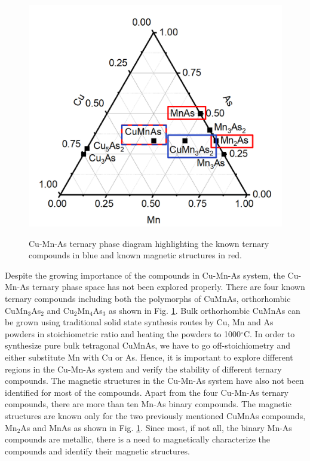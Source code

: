 \documentclass[11pt,edeposit,draftthesis]{uiucthesis2020}
\begin{document}
\begin{mainmatter}
\begin{figure}
\centering\includegraphics[width=0.8\columnwidth]{figures/ch1/Cu-Mn-As phase diagram.png} \\
\caption{\label{fig:Cu-Mn-As}
Cu-Mn-As ternary phase diagram highlighting the known ternary compounds in blue and known magnetic structures in red.
}
\end{figure}


Despite the growing importance of the compounds in Cu-Mn-As system, the Cu-Mn-As ternary phase space has not been explored properly. There are four known ternary compounds including both the polymorphs of CuMnAs, orthorhombic CuMn$_3$As$_2$ and Cu$_2$Mn$_4$As$_3$ as shown in Fig. \ref{fig:Cu-Mn-As}. Bulk orthorhombic CuMnAs can be grown using traditional solid state synthesis routes by Cu, Mn and As powders in stoichiometric ratio and heating the powders to 1000$^\circ$C. In order to synthesize pure bulk tetragonal CuMnAs, we have to go off-stoichiometry and either substitute Mn with Cu or As. Hence, it is important to explore different regions in the Cu-Mn-As system and verify the stability of different ternary compounds. The magnetic structures in the Cu-Mn-As system have also not been identified for most of the compounds. Apart from the four Cu-Mn-As ternary compounds, there are more than ten Mn-As binary compounds. The magnetic structures are known only for the two previously mentioned CuMnAs compounds, Mn$_2$As and MnAs as shown in Fig. \ref{fig:Cu-Mn-As}. Since most, if not all, the binary Mn-As compounds are metallic, there is a need to magnetically characterize the compounds and identify their magnetic structures.


\end{mainmatter}
\end{document}
